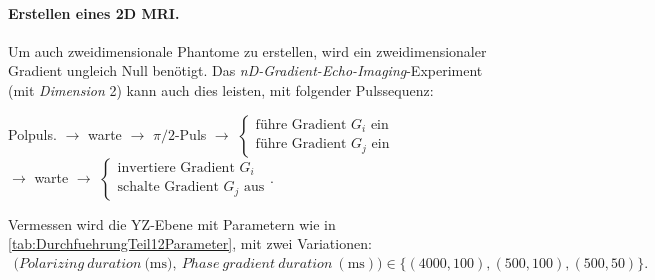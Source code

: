 \documentclass[../main.tex]{subfiles}
\begin{document}
    \paragraph{Erstellen eines 2D MRI.}
        Um auch zweidimensionale Phantome zu erstellen, wird ein zweidimensionaler Gradient ungleich Null benötigt. Das \textit{nD-Gradient-Echo-Imaging}-Experiment (mit \textit{Dimension} 2) kann auch dies leisten, mit folgender Pulssequenz:
        \begin{center}
            Polpuls. $\longrightarrow$ warte $\longrightarrow$ $\pi/2$-Puls $\longrightarrow$ $\begin{cases}\text{führe Gradient $G_i$ ein} \\ \text{führe Gradient $G_j$ ein}\end{cases}$\\
            $\longrightarrow$ warte $\longrightarrow$ $\begin{cases}\text{invertiere Gradient $G_i$} \\ \text{schalte Gradient $G_j$ aus}\end{cases}$.
        \end{center}

        Vermessen wird die YZ-Ebene mit Parametern wie in \ref{tab:DurchfuehrungTeil12Parameter}, mit zwei Variationen:
        \small{
        \begin{align*}
            (Polarizing\ duration\ (\si{\milli\second),\  Phase\ gradient\ duration\ (\si{\milli\second}))}\in\{(4000, 100), (500, 100), (500, 50)\}.
        \end{align*}
        }
        
\end{document}
